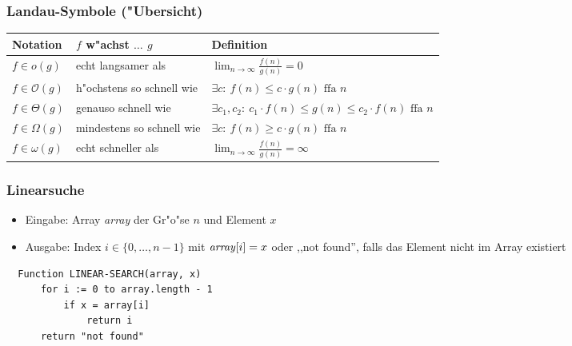\documentclass[t]{beamer}
\newcommand{\bigO}{\ensuremath{\mathcal{O}}}
\begin{document}
\begin{frame}
  \frametitle{Landau-Symbole ("Ubersicht)}
  \begin{center}
  \begin{tabular}{| l || l | l |} \hline
  \textbf{Notation} & \textbf{$f$ w"achst $\ldots$ $g$} & \textbf{Definition} \\ \hline
  $f \in o(g)$
      & echt langsamer als
      & $\lim_{n\rightarrow \infty} \frac{f(n)}{g(n)} = 0$
      \\ \hline
  $f \in \bigO(g)$
      & \footnotesize h"ochstens so schnell wie \normalsize
      & $\exists c: \ f(n) \leq c\cdot g(n) \text{ ffa } n$
      \\ \hline
  $f \in \Theta(g)$
      & genauso schnell wie
      & \footnotesize $\exists c_1, c_2: \ c_1\cdot f(n) \leq g(n) \leq c_2 \cdot f(n) \text{ ffa } n$ \normalsize
      \\ \hline
  $f \in \Omega(g)$
      & \footnotesize mindestens so schnell wie \normalsize
      & $\exists c: \ f(n) \geq c\cdot g(n) \text{ ffa } n$
      \\ \hline
  $f \in \omega(g)$
      & echt schneller als
      & $\lim_{n\rightarrow \infty} \frac{f(n)}{g(n)} = \infty$
      \\ \hline
  \end{tabular}
  \end{center}
\end{frame}

\begin{frame}[fragile]
  \frametitle{Linearsuche}
  \begin{itemize}
  \item Eingabe: Array \emph{array} der Gr"o"se $n$ und Element $x$
  \item Ausgabe: Index $i \in \{0,\ldots,n-1\}$ mit $\text{\emph{array}}[i] = x$
                 oder ,,not found'', falls das Element nicht im Array existiert
  \end{itemize}
  \begin{lstlisting}
  Function LINEAR-SEARCH(array, x)
      for i := 0 to array.length - 1
          if x = array[i]
              return i
      return "not found"
  \end{lstlisting}
\end{frame}
\end{document}
